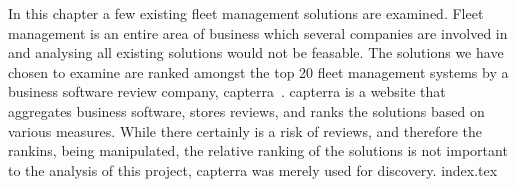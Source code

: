 In this chapter a few existing fleet management solutions are examined.
Fleet management is an entire area of business which several companies are involved in and analysing all existing solutions would not be feasable.
The solutions we have chosen to examine are ranked amongst the top 20 fleet management systems by a business software review company, capterra~\cite{top20fleetmanagement}.
capterra is a website that aggregates business software, stores reviews, and ranks the solutions based on various measures.
While there certainly is a risk of reviews, and therefore the rankins, being manipulated, the relative ranking of the solutions is not important to the analysis of this project, capterra was merely used for discovery.
{index.tex}
